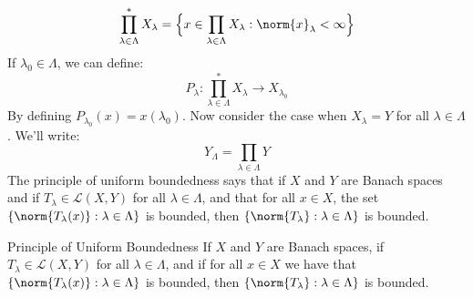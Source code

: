         \begin{equation}
            \prod_{\lambda\in\Lambda}^{*}X_{\lambda}
            =\Big\{x\in\prod_{\lambda\in\Lambda}X_{\lambda}:
                \norm{x}_{\lambda}<\infty\Big\}
        \end{equation}
        If $\lambda_{0}\in\Lambda$, we can define:
        \begin{equation}
            P_{\lambda}:\prod_{\lambda\in\Lambda}^{*}X_{\lambda}
            \rightarrow{X}_{\lambda_{0}}
        \end{equation}
        By defining $P_{\lambda_{0}}(x)=x(\lambda_{0})$.
        Now consider the case when $X_{\lambda}=Y$ for all
        $\lambda\in\Lambda$. We'll write:
        \begin{equation}
            Y_{\Lambda}=\prod_{\lambda\in\Lambda}Y
        \end{equation}
        The principle of uniform boundedness says that if
        $X$ and $Y$ are Banach spaces and if
        $T_{\lambda}\in\mathcal{L}(X,Y)$ for all
        $\lambda\in\Lambda$, and that for all $x\in{X}$, the set
        $\{\norm{T_{\lambda}(x)}:\lambda\in\Lambda\}$ is
        bounded, then $\{\norm{T_{\lambda}}:\lambda\in\Lambda\}$
        is bounded.
        \begin{ltheorem}{Principle of Uniform Boundedness}{}
            If $X$ and $Y$ are Banach spaces, if
            $T_{\lambda}\in\mathcal{L}(X,Y)$ for all
            $\lambda\in\Lambda$, and if for all $x\in{X}$ we 
            have that $\{\norm{T_{\lambda}(x)}:\lambda\in\Lambda\}$
            is bounded, then
            $\{\norm{T_{\lambda}}:\lambda\in\Lambda\}$ is bounded.
        \end{ltheorem}

